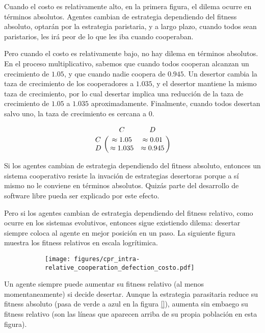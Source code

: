 \documentclass[a4paper,10pt]{article}
\begin{document}
%

Cuando el costo es relativamente alto, en la primera figura, el dilema ocurre en términos absolutos.
Agentes cambian de estrategia dependiendo del fitness absoluto, optarán por la estrategia paristaria, y a largo plazo, cuando todos sean paristarios, les irá peor de lo que les iba cuando cooperaban.


Pero cuando el costo es relativamente bajo, no hay dilema en términos absolutos.
En el proceso multiplicativo, sabemos que cuando todos cooperan alcanzan un crecimiento de $1.05$, y que cuando nadie coopera de $0.945$.
Un desertor cambia la taza de crecimiento de los cooperadores a $1.035$, y el desertor mantiene la mismo taza de crecimiento, por lo cual desertar implica una reducción de la taza de crecimiento de $1.05$ a $1.035$ aproximadamente.
Finalmente, cuando todos desertan salvo uno, la taza de crecimiento es cercana a $0$.

\begin{equation}
    \bordermatrix{ & C & D \cr
      C & \approx 1.05 & \approx 0.01 \cr
      D & \approx 1.035 & \approx 0.945  } 
\end{equation}

Si los agentes cambian de estrategia dependiendo del fitness absoluto, entonces un sistema cooperativo resiste la invación de estrategias desertoras porque a sí mismo no le conviene en términos absolutos.
Quizás parte del desarrollo de software libre pueda ser explicado por este efecto.


Pero si los agentes cambian de estrategia dependiendo del fitness relativo, como ocurre en los sistemas evolutivos, entonces sigue existiendo dilema: desertar siempre coloca al agente en mejor posición en un paso. 
La siguiente figura muestra los fitness relativos en escala logrítimica.

\begin{figure}[H]
    \centering
    \begin{subfigure}[b]{0.45\textwidth}
    \texttt{[image: figures/cpr\_intra-relative\_cooperation\_defection\_costo.pdf]}
    \end{subfigure}
    \caption{}
    \label{fig:intra-relative}
\end{figure}

Un agente siempre puede aumentar su fitness relativo (al menos momentaneamente) si decide desertar.
Aunque la estrategia parasitaria reduce su fitness absoluto (pasa de verde a azul en la figura \ref{}), aumenta sin embaego su fitness relativo (son las líneas que aparecen arriba de su propia población en esta figura).
\end{document}
